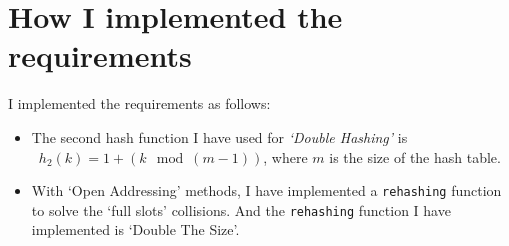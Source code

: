\section{How I implemented the requirements}
\begin{flushleft}
  I implemented the requirements as follows:
  \begin{itemize}
    \item The second hash function I have used for \textsl{`Double Hashing'} is\\~\(h_2(k) = 1 + (k \mod (m - 1))\), where \(m\) is the size of the hash table.
    \item With `Open Addressing' methods, I have implemented a \verb|rehashing| function to solve the `full slots' collisions. And the \verb|rehashing| function I have implemented is `Double The Size'.
  \end{itemize}
\end{flushleft}